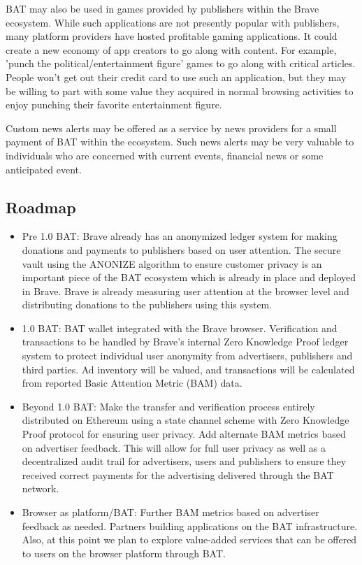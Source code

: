 \documentclass[11pt]{article}
\begin{document}
\textrm{BAT} may also be used in games provided by publishers within the Brave ecosystem. While such applications are not presently popular with publishers, many platform providers have hosted profitable gaming applications. It could create a new economy of app creators to go along with content. For example, 'punch the political/entertainment figure' games to go along with critical articles. People won't get out their credit card to use such an application, but they may be willing to part with some value they acquired in normal browsing activities to enjoy punching their favorite entertainment figure.

Custom news alerts may be offered as a service by news providers for a small payment of \textrm{BAT} within the ecosystem. Such news alerts may be very valuable to individuals who are concerned with current events, financial news or some anticipated event.

\subsection{Roadmap}
\label{sec-4-5}
\begin{itemize}
\item{Pre 1.0 \textrm{BAT}: Brave already has an anonymized ledger system for making donations and payments to publishers based on user attention. The secure vault using the ANONIZE algorithm to ensure customer privacy is an important piece of the \textrm{BAT} ecosystem which is already in place and deployed in Brave. Brave is already measuring user attention at the browser level and distributing donations to the publishers using this system.}
\item{1.0 \textrm{BAT}: \textrm{BAT} wallet integrated with the Brave browser. Verification and transactions to be handled by Brave's internal Zero Knowledge Proof ledger system to protect individual user anonymity from advertisers, publishers and third parties.  Ad inventory will be valued, and transactions will be calculated from reported Basic Attention Metric (BAM) data. }
\item{Beyond 1.0 \textrm{BAT}: Make the transfer and verification process entirely distributed on Ethereum using a state channel scheme with Zero Knowledge Proof protocol for ensuring user privacy. Add alternate BAM metrics based on advertiser feedback. This will allow for full user privacy as well as a decentralized audit trail for advertisers, users and publishers to ensure they received correct payments for the advertising delivered through the \textrm{BAT} network.}
\item{Browser as platform/\textrm{BAT}:  Further BAM metrics based on advertiser feedback as needed. Partners building applications on the \textrm{BAT} infrastructure. Also, at this point we plan to explore value-added services that can be offered to users on the browser platform through \textrm{BAT}.}
\end{itemize}
\end{document}
